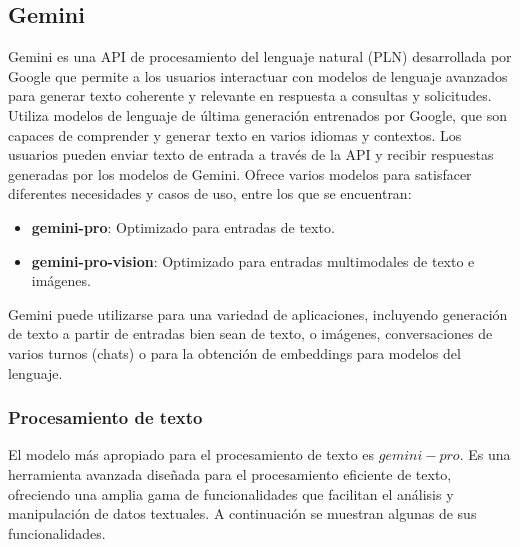 \subsection{Gemini}
\label{sec:gemini}

Gemini es una API de procesamiento del lenguaje natural (PLN) desarrollada por Google que permite a los usuarios interactuar con modelos de lenguaje avanzados para generar texto coherente y relevante en respuesta a consultas y solicitudes. Utiliza modelos de lenguaje de última generación entrenados por Google, que son capaces de comprender y generar texto en varios idiomas y contextos. Los usuarios pueden enviar texto de entrada a través de la API y recibir respuestas generadas por los modelos de Gemini. Ofrece varios modelos para satisfacer diferentes necesidades y casos de uso, entre los que se encuentran:
\begin{itemize}[label=$\bullet$, leftmargin=*]
	\item \textbf{gemini-pro}: Optimizado para entradas de texto.
	\item \textbf{gemini-pro-vision}: Optimizado para entradas multimodales de texto e imágenes.
\end{itemize}

Gemini puede utilizarse para una variedad de aplicaciones, incluyendo generación de texto a partir de entradas bien sean de texto, o imágenes, conversaciones de varios turnos (chats) o para la obtención de embeddings para modelos del lenguaje. 


\subsubsection{Procesamiento de texto}
\label{estructurarespuesta}

El modelo más apropiado para el procesamiento de texto es $gemini-pro$. Es una herramienta avanzada diseñada para el procesamiento eficiente de texto, ofreciendo una amplia gama de funcionalidades que facilitan el análisis y manipulación de datos textuales. A continuación se muestran algunas de sus funcionalidades.
	
